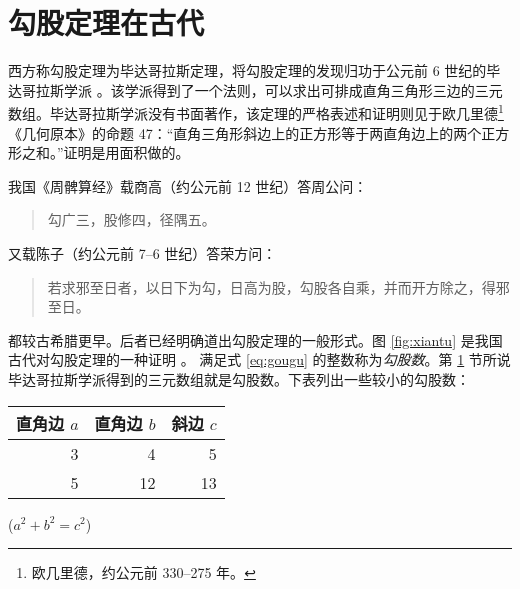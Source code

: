\documentclass[UTF8]{ctexart}
\title{\heiti }
\author{\kaishu }
\date{\today}
\theoremstyle{plain}
\theoremstyle{definition}
\theoremstyle{remark}
\newenvironment{myquote}
  {\begin{quote}\kaishu\zihao{-5}}
  {\end{quote}}
\begin{document}
\maketitle

\begin{abstract}
这是一篇关于勾股定理的小短文。
\end{abstract}

\tableofcontents

\section{勾股定理在古代}
\label{sec:ancient}

西方称勾股定理为毕达哥拉斯定理，将勾股定理的发现归功于公元前 6 世纪的毕达哥拉斯学派 \cite{Kline}。该学派得到了一个法则，可以求出可排成直角三角形三边的三元数组。毕达哥拉斯学派没有书面著作，该定理的严格表述和证明则见于欧几里德\footnote{欧几里德，约公元前 330--275 年。}《几何原本》的命题 47：“直角三角形斜边上的正方形等于两直角边上的两个正方形之和。”证明是用面积做的。

我国《周髀算经》载商高（约公元前 12 世纪）答周公问：
\begin{myquote}
勾广三，股修四，径隅五。
\end{myquote}
又载陈子（约公元前 7--6 世纪）答荣方问：
\begin{myquote}
若求邪至日者，以日下为勾，日高为股，勾股各自乘，并而开方除之，得邪至日。
\end{myquote}
都较古希腊更早。后者已经明确道出勾股定理的一般形式。图 \ref{fig:xiantu} 是我国古代对勾股定理的一种证明 \cite{quanjing}。
满足式 \eqref{eq:gougu} 的整数称为\emph{勾股数}。第 \ref{sec:ancient} 节所说毕达哥拉斯学派得到的三元数组就是勾股数。下表列出一些较小的勾股数：
\begin{table}[H]
\begin{tabular}{|rrr|}
\hline
直角边 $a$ & 直角边 $b$ & 斜边 $c$\\
\hline
3 & 4 & 5 \\
5 & 12 & 13 \\
\hline
\end{tabular}%
\qquad
($a^2 + b^2 = c^2$)
\end{table}

\nocite{Shiye}

\end{document}
